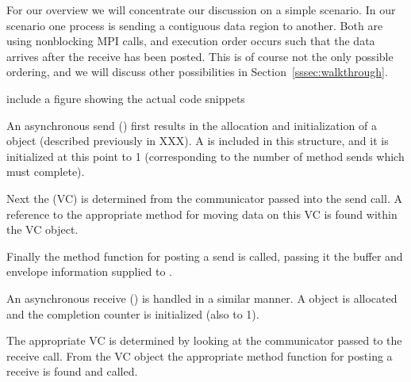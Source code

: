 For our overview we will concentrate our discussion on a simple scenario.  In
our scenario one process is sending a contiguous data region to another.  Both
are using nonblocking MPI calls, and execution order occurs such that the data
arrives after the receive has been posted.  This is of course not the only
possible ordering, and we will discuss other possibilities in
Section~\ref{sssec:walkthrough}.

\begin{cmt}
  include a figure showing the actual code snippets
\end{cmt}


An asynchronous send () first results in the allocation and
initialization of a  object (described previously in XXX).
A  is included in this structure, and it is
initialized at this point to 1 (corresponding to the number of method sends
which must complete).

Next the  (VC) is determined from the communicator
passed into the send call.  A reference to the appropriate method for moving
data on this VC is found within the VC object.

Finally the method function for posting a send is called, passing it the buffer
and envelope information supplied to . 



An asynchronous receive () is handled in a similar manner.
A  object is allocated and the completion counter is
initialized (also to 1).

The appropriate VC is determined by looking at the communicator passed to the
receive call.  From the VC object the appropriate method function for posting a
receive is found and called.
 
% 


